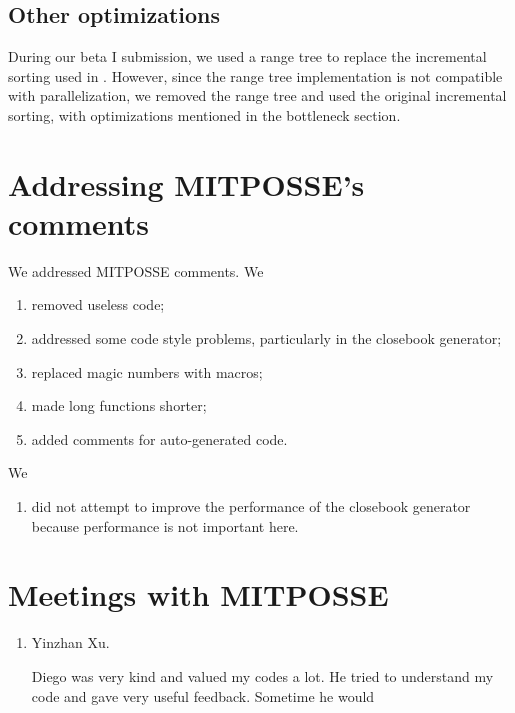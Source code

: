 \documentclass[10pt,twosidep]{article}
\begin{document}
\subsection{Other optimizations}
During our beta I submission, we used a range tree to replace the incremental sorting used in \scs. However, since the range tree implementation is not compatible with parallelization, we removed the range tree and used the original incremental sorting, with optimizations mentioned in the bottleneck section. 

\section{Addressing MITPOSSE's comments}

We addressed MITPOSSE comments. We 
\begin{enumerate}
	\item removed useless code;
	\item addressed some code style problems, particularly in the closebook generator;
	\item replaced magic numbers with macros;
	\item made long functions shorter;
	\item added comments for auto-generated code.
\end{enumerate}

We
\begin{enumerate}
	\item did not attempt to improve the performance of the closebook generator because performance is not important here.
\end{enumerate}

\section{Meetings with MITPOSSE}

\begin{enumerate}
	\item Yinzhan Xu. 
	
	Diego was very kind and valued my codes a lot. He tried to understand my code and gave very useful feedback. Sometime he would 
\end{enumerate}
\end{document}
